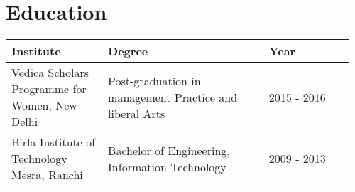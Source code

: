 \section{Education}


\begin{table}[htbp]
    \centering
    \renewcommand{\arraystretch}{.85} %
    \setlength{\arrayrulewidth}{.7pt} %
    \begin{tabularx}{.97\textwidth}{|>{\centering\arraybackslash}p{0.27\linewidth}|>{\centering\arraybackslash}p{0.45\linewidth}|>{\centering\arraybackslash}p{0.245\linewidth}|}
        \hline
        \rowcolor[gray]{0.9}
        \small Institute & \small Degree & \small Year \\
        \hline
        \small Vedica Scholars Programme for Women, New Delhi & \small Post-graduation in management Practice and liberal Arts & \small 2015 - 2016 \\
        \hline
        \small Birla Institute of Technology Mesra, Ranchi & \small Bachelor of Engineering, Information Technology & \small 2009 - 2013 \\
        \hline
    \end{tabularx}

\end{table}
